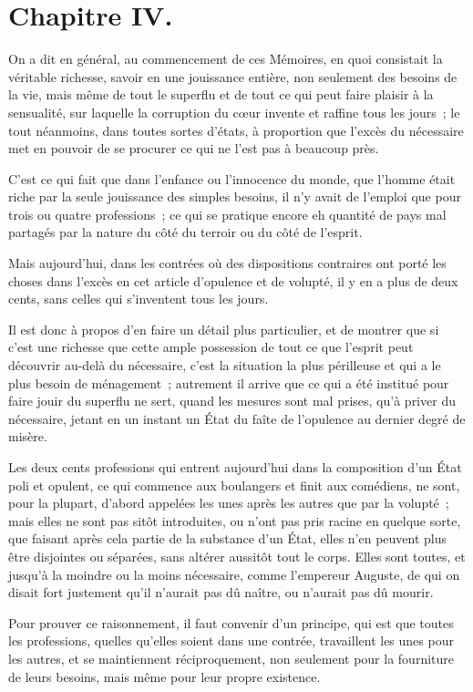 \documentclass[french,twoside]{book} %
\begin{document}
\section[{Chapitre IV.}]{Chapitre IV.}
\noindent On a dit en général, au commencement de ces Mémoires, en quoi consistait la véritable richesse, savoir en une jouissance entière, non seulement des besoins de la vie, mais même de tout le superflu et de tout ce qui peut faire plaisir à la sensualité, sur laquelle la corruption du cœur invente et raffine tous les jours ; le tout néanmoins, dans toutes sortes d’états, à proportion que l’excès du nécessaire met en pouvoir de se procurer ce qui ne l’est pas à beaucoup près.\par
C’est ce qui fait que dans l’enfance ou l’innocence du monde, que l’homme était riche par la seule jouissance des simples besoins, il n’y avait de l’emploi que pour trois ou quatre professions ; ce qui se pratique encore eh quantité de pays mal partagés par la nature du côté du terroir ou du côté de l’esprit.\par
Mais aujourd’hui, dans les contrées où des dispositions contraires ont porté les choses dans l’excès en cet article d’opulence et de volupté, il y en a plus de deux cents, sans celles qui s’inventent tous les jours.\par
Il est donc à propos d’en faire un détail plus particulier, et de montrer que si c’est une richesse que cette ample possession de tout ce que l’esprit peut découvrir au-delà du nécessaire, c’est la situation la plus périlleuse et qui a le plus besoin de ménagement ; autrement il arrive que ce qui a été institué pour faire jouir du superflu ne sert, quand les mesures sont mal prises, qu’à priver du nécessaire, jetant en un instant un État du faîte de l’opulence au dernier degré de misère.\par
Les deux cents professions qui entrent aujourd’hui dans la composition d’un État poli et opulent, ce qui commence aux boulangers et finit aux comédiens, ne sont, pour la plupart, d’abord appelées les unes après les autres que par la volupté ; mais elles ne sont pas sitôt introduites, ou n’ont pas pris racine en quelque sorte, que faisant après cela partie de la substance d’un État, elles n’en peuvent plus être disjointes ou séparées, sans altérer aussitôt tout le corps. Elles sont toutes, et jusqu’à la moindre ou la moins nécessaire, comme l’empereur Auguste, de qui on disait fort justement qu’il n’aurait pas dû naître, ou n’aurait pas dû mourir.\par
Pour prouver ce raisonnement, il faut convenir d’un principe, qui est que toutes les professions, quelles qu’elles soient dans une contrée, travaillent les unes pour les autres, et se maintiennent réciproquement, non seulement pour la fourniture de leurs besoins, mais même pour leur propre existence.\par
\end{document}
